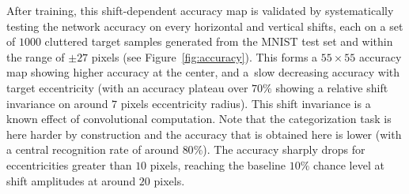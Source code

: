After training, this shift-dependent accuracy map is validated by systematically testing the network accuracy on every horizontal and vertical shifts, each on a set of $1000$ cluttered target samples generated from the MNIST test set and within the range of $\pm 27$ pixels (see Figure~\ref{fig:accuracy}).  This forms a $55\times 55$ accuracy map showing higher accuracy at the center, and a slow decreasing accuracy with target eccentricity (with an accuracy plateau  over $70\%$ showing a relative shift invariance on around $7$ pixels eccentricity radius). This shift invariance is a known effect of convolutional computation. Note that the categorization task is here harder by construction and the accuracy that is obtained here is lower (with a central recognition rate of around $80\%$). The accuracy sharply drops for eccentricities  greater than $10$ pixels, reaching the baseline $10\%$ chance level at shift amplitudes at around $20$ pixels.

